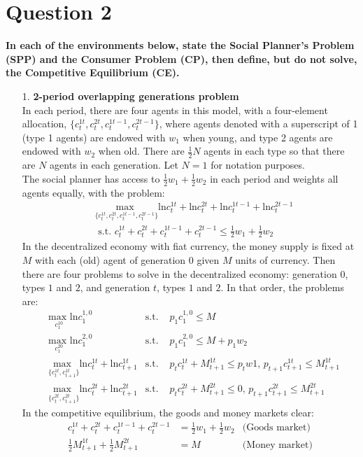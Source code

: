 \documentclass{article}
\begin{document}

\section*{Question 2}
\textbf{In each of the environments below, state the Social Planner's Problem (SPP) and the Consumer Problem (CP), then define, but do not solve, the Competitive Equilibrium (CE).}
\medskip \\
\begin{itemize}
	\item[1.] \textbf{2-period overlapping generations problem}
		\medskip \\
		In each period, there are four agents in this model, with a four-element allocation, $\{c_t^{1t},c_t^{2t},c_t^{1t-1},c_t^{2t-1}\}$, where agents denoted with a superscript of 1 (type 1 agents) are endowed with $w_1$ when young, and type 2 agents are endowed with $w_2$ when old. There are $\frac{1}{2}N$ agents in each type so that there are $N$ agents in each generation. Let $N=1$ for notation purposes.
		\smallskip \\
		The social planner has access to $\frac{1}{2}w_1+\frac{1}{2}w_2$ in each period and weights all agents equally, with the problem:
		\begin{align*}
			&\underset{\{c_t^{1t},c_t^{2t},c_t^{1t-1},c_t^{2t-1}\}}{\text{max }}\text{ln}c_t^{1t}+\text{ln}c_t^{2t}+\text{ln}c_t^{1t-1}+\text{ln}c_t^{2t-1} \\
			&\text{  s.t.  }c_t^{1t}+c_t^{2t}+c_t^{1t-1}+c_t^{2t-1}\leq\frac{1}{2}w_1+\frac{1}{2}w_2
		\end{align*}
		In the decentralized economy with fiat currency, the money supply is fixed at $M$ with each (old) agent of generation $0$ given $M$ units of currency. Then there are four problems to solve in the decentralized economy: generation $0$, types $1$ and $2$, and generation $t$, types $1$ and $2$. In that order, the problems are:
		\begin{align*}
			&\underset{c_1^{10}}{\text{max }}\text{ln}c_1^{1,0}											 &\text{s.t. } &p_1c_1^{1,0}	\leq M 				\\
			&\underset{c_1^{20}}{\text{max }}\text{ln}c_1^{2,0}											 &\text{s.t. } &p_1c_1^{2,0}	\leq M + p_1 w_2	\\
			&\underset{\{c_t^{1t},c_{t+1}^{1t}\}}{\text{max }} \text{ln}c_t^{1t} + \text{ln}c_{t+1}^{1t}
				&\text{s.t. } 	&p_tc_t^{1t} + M^{1t}_{t+1}	\leq p_tw1\text{, }p_{t+1}c^{1t}_{t+1}		\leq M^{1t}_{t+1}	\\
			&\underset{\{c_t^{2t},c_{t+1}^{2t}\}}{\text{max }} \text{ln}c_t^{2t} + \text{ln}c_{t+1}^{2t}
				&\text{s.t. } 	&p_tc_t^{2t} + M^{2t}_{t+1}	\leq 0\text{, }p_{t+1}c^{2t}_{t+1}		\leq M^{2t}_{t+1}	
		\end{align*}
		In the competitive equilibrium, the goods and money markets clear:
		\begin{align*}
			c_t^{1t}+c_t^{2t}+c_t^{1t-1}+c_t^{2t-1} 		&= \frac{1}{2}w_1+\frac{1}{2}w_2	&\text{(Goods market)}	\\
			\frac{1}{2}M_{t+1}^{1t}+\frac{1}{2}M_{t+1}^{2t}	&= M								&\text{(Money market)}	
		\end{align*}
		

\end{itemize}
\end{document}
